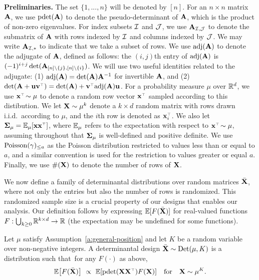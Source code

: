 \documentclass[11pt]{article}
\begin{document}
\textbf{Preliminaries.}
The set $\{1,...,n\}$ will be denoted by $[n]$. 
For an $n\times n$ matrix $\mathbf A$, we use $\mathrm{pdet}(\mathbf A)$ to denote the pseudo-determinant of $\mathbf A$,
which is the product of non-zero eigenvalues. For index subsets $\mathcal I$
and $\mathcal{J}$, we use $\mathbf A_{\mathcal I,\mathcal{J}}$ to denote the submatrix of $\mathbf A$ with
rows indexed by $\mathcal I$ and columns indexed by $\mathcal{J}$. We may write
$\mathbf A_{\mathcal I,*}$ to indicate that we take a subset of rows. We use $\operatorname{\textnormal{adj}}(\mathbf A)$ to
denote the adjugate of $\mathbf A$, defined as follows: the
$(i,j)$th entry of $\operatorname{\textnormal{adj}}(\mathbf A)$ is
$(-1)^{i+j}\det(\mathbf A_{[n]\backslash\{j\},[n]\backslash\{i\}})$. We will
use two useful identities related to the adjugate: (1)
$\operatorname{\textnormal{adj}}(\mathbf A)=\det(\mathbf A)\mathbf A^{-1}$ for invertible $\mathbf A$, and (2)
$\det(\A+\u\v^\top)=\det(\A)+\v^\top\!\adj(\A)\u$.
For a probability measure $\mu$ over $\mathbb R^d$, we use $\x^\top\!\sim\mu$
to denote a random row vector $\x^\top$ sampled according to this distibution.
We let $\mathbf X\sim\mu^k$ denote a $k\times d$ random matrix with rows
drawn i.i.d.~according to $\mu$, and the $i$th row is denoted as $\x_i^\top$.  
We also let $\Sigmab_\mu=\E_{\mu}[\x\x^\top]$, where $\mathbb E_{\mu}$ refers to
the expectation with respect to $\x^\top\!\sim\mu$, assuming throughout that
$\mathbf{\Sigma}_\mu$ is well-defined and positive definite.
We use ${\operatorname{Poisson}}(\gamma)_{\leq a}$ as the Poisson distribution restricted to values less than or equal to $a$, and a similar convention is used for the restriction to values greater or equal $a$. 
Finally, we use $\#(\mathbf X)$ to denote the number of rows of $\mathbf X$.

We now define a family of determinantal distributions over random matrices ${\bar{\mathbf X}}$,
where not only the entries but also the number of rows is
randomized. 
This randomized sample size is a crucial property of our
designs that enables our analysis. 
Our definition follows by
expressing $\mathbb E[F({\bar{\mathbf X}})]$ for real-valued functions $F:\bigcup_{k\geq 0}\mathbb R^{k\times
  d}\rightarrow \mathbb R$ (the expectation may be undefined for some functions).  
\begin{definition}\label{d:det}
  Let $\mu$ satisfy Assumption~\ref{a:general-position} and let $K$ be
  a random variable over non-negative integers. A determinantal design
    ${\bar{\mathbf X}}\sim {\mathrm{Det}}(\mu,K)$ is a 
distribution such that~for any $F(\cdot)$ as above,
\begin{align*}
  \E\big[F(\Xb)\big]\  \propto\ \E[\pdet(\X\X^\top)F(\X)]
  \quad\text{for}\quad\X\sim\mu^K.
\end{align*}
\end{definition}
\end{document}
